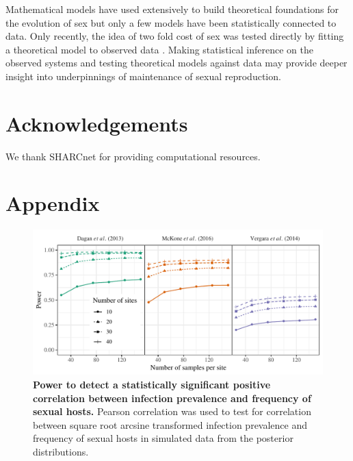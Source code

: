 \documentclass{article}\usepackage[]{graphicx}\usepackage[]{color}
\begin{document}
Mathematical models have used extensively to build theoretical foundations for the evolution of sex but only a few models have been statistically connected to data.
Only recently, the idea of two fold cost of sex was tested directly by fitting a theoretical model to observed data \citep{gibson2017two}.
Making statistical inference on the observed systems and testing theoretical models against data may provide deeper insight into underpinnings of maintenance of sexual reproduction.

\section{Acknowledgements}

We thank SHARCnet for providing computational resources.



\pagebreak
\section*{Appendix}

\renewcommand\thefigure{A\arabic{figure}}    
\setcounter{figure}{0}   

\begin{figure}[!ht]
\includegraphics[width=\textwidth]{../fig/power_lm.pdf}
\caption{{\bf Power to detect a statistically significant positive correlation between infection prevalence and frequency of sexual hosts.}
Pearson correlation was used to test for correlation between square root arcsine transformed infection prevalence and frequency of sexual hosts in simulated data from the posterior distributions.
}
\label{fig:power_lm}
\end{figure}
\end{document}
